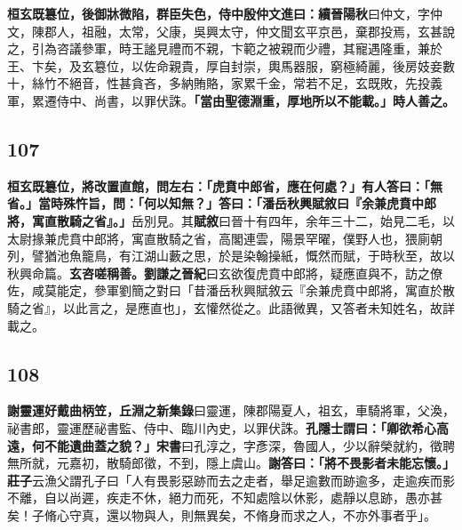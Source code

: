 \textbf{桓玄既簒位，後御牀微陷，群臣失色，侍中殷仲文進曰：}{\footnotesize \textbf{續晉陽秋}曰仲文，字仲文，陳郡人，祖融，太常，父康，吳興太守，仲文聞玄平京邑，棄郡投焉，玄甚說之，引為咨議參軍，時王謐見禮而不親，卞範之被親而少禮，其寵遇隆重，兼於王、卞矣，及玄簒位，以佐命親貴，厚自封崇，輿馬器服，窮極綺麗，後房妓妾數十，絲竹不絕音，性甚貪吝，多納賄賂，家累千金，常若不足，玄既敗，先投義軍，累遷侍中、尚書，以罪伏誅。}\textbf{「當由聖德淵重，厚地所以不能載。」時人善之。}

\subsection*{107}

\textbf{桓玄既簒位，將改置直館，問左右：「虎賁中郎省，應在何處？」有人答曰：「無省。」當時殊忤旨，問：「何以知無？」答曰：「潘岳秋興賦敘曰『余兼虎賁中郎將，寓直散騎之省』。」}{\footnotesize 岳別見。其\textbf{賦敘}曰晉十有四年，余年三十二，始見二毛，以太尉掾兼虎賁中郎將，寓直散騎之省，高閣連雲，陽景罕曜，僕野人也，猥廁朝列，譬猶池魚籠鳥，有江湖山藪之思，於是染翰操紙，慨然而賦，于時秋至，故以秋興命篇。}\textbf{玄咨嗟稱善。}{\footnotesize \textbf{劉謙之晉紀}曰玄欲復虎賁中郎將，疑應直與不，訪之僚佐，咸莫能定，參軍劉簡之對曰「昔潘岳秋興賦敘云『余兼虎賁中郎將，寓直於散騎之省』，以此言之，是應直也」，玄懽然從之。此語微異，又答者未知姓名，故詳載之。}

\subsection*{108}

\textbf{謝靈運好戴曲柄笠，}{\footnotesize \textbf{丘淵之新集錄}曰靈運，陳郡陽夏人，祖玄，車騎將軍，父渙，祕書郎，靈運歷祕書監、侍中、臨川內史，以罪伏誅。}\textbf{孔隱士謂曰：「卿欲希心高遠，何不能遺曲蓋之貌？」}{\footnotesize \textbf{宋書}曰孔淳之，字彥深，魯國人，少以辭榮就約，徵聘無所就，元嘉初，散騎郎徵，不到，隱上虞山。}\textbf{謝答曰：「將不畏影者未能忘懷。」}{\footnotesize \textbf{莊子}云漁父謂孔子曰「人有畏影惡跡而去之走者，舉足逾數而跡逾多，走逾疾而影不離，自以尚遲，疾走不休，絕力而死，不知處陰以休影，處靜以息跡，愚亦甚矣！子脩心守真，還以物與人，則無異矣，不脩身而求之人，不亦外事者乎」。}